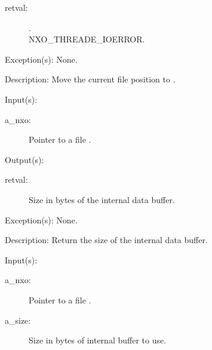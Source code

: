 \begin{capi}
\begin{capilist}
		\begin{description}\item[]
		\item[retval: ]
			\begin{description}\item[]
			\item[.]
			\item[
				{NXO_THREADE_IOERROR}.]
			\end{description}
		\end{description}
	\item[Exception(s): ] None.
	\item[Description: ]
		Move the current file position to .
	\end{capilist}
\label{nxo_file_buffer_size_get}
	\begin{capilist}
	\item[Input(s): ]
		\begin{description}\item[]
		\item[a\_nxo: ]
			Pointer to a file .
		\end{description}
	\item[Output(s): ]
		\begin{description}\item[]
		\item[retval: ]
			Size in bytes of the internal data buffer.
		\end{description}
	\item[Exception(s): ] None.
	\item[Description: ]
		Return the size of the internal data buffer.
	\end{capilist}
\label{nxo_file_buffer_size_set}
	\begin{capilist}
	\item[Input(s): ]
		\begin{description}\item[]
		\item[a\_nxo: ]
			Pointer to a file \classname{nxo}.
		\item[a\_size: ]
			Size in bytes of internal buffer to use.

\end{description}
\end{capilist}
\end{capi}
